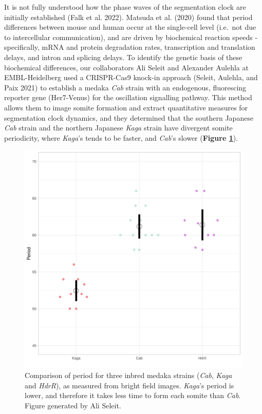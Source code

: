 \documentclass[
]{book}
\begin{document}
It is not fully understood how the phase waves of the segmentation clock are initially established (Falk et al. 2022). Matsuda et al. (2020) found that period differences between mouse and human occur at the single-cell level (i.e.~not due to intercellular communication), and are driven by biochemical reaction speeds - specifically, mRNA and protein degradation rates, transcription and translation delays, and intron and splicing delays. To identify the genetic basis of these biochemical differences, our collaborators Ali Seleit and Alexander Aulehla at EMBL-Heidelberg used a CRISPR-Cas9 knock-in approach (Seleit, Aulehla, and Paix 2021) to establish a medaka \emph{Cab} strain with an endogenous, fluorescing reporter gene (Her7-Venus) for the oscillation signalling pathway. This method allows them to image somite formation and extract quantitative measures for segmentation clock dynamics, and they determined that the southern Japanese \emph{Cab} strain and the northern Japanese \emph{Kaga} strain have divergent somite periodicity, where \emph{Kaga}'s tends to be faster, and \emph{Cab}'s slower (\textbf{Figure \ref{fig:F0-Cab-Kaga-HdrR}}).



\begin{figure}

{\centering \includegraphics[width=0.5\linewidth]{figs/somites/ali_period_F0_Cab_Kaga} 

}

\caption{Comparison of period for three inbred medaka strains (\emph{Cab}, \emph{Kaga} and \emph{HdrR}), as measured from bright field images. \emph{Kaga}'s period is lower, and therefore it takes less time to form each somite than \emph{Cab}. Figure generated by Ali Seleit.}\label{fig:F0-Cab-Kaga-HdrR}
\end{figure}
\end{document}
